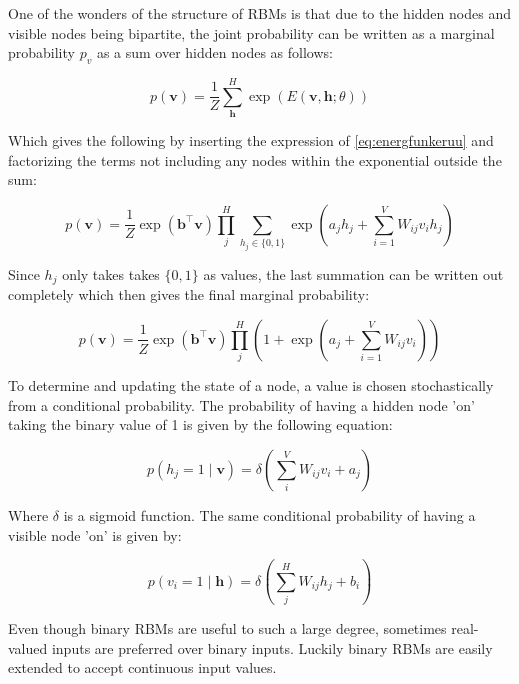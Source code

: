 \documentclass[../main.tex]{subfiles}
\begin{document}
One of the wonders of the structure of RBMs is that due to the hidden nodes and visible nodes being bipartite, the joint probability can be written as a marginal probability $p_{v}$ as a sum over hidden nodes as follows\cite{rbm_article}:

\begin{equation*}
    p(\mathbf{v}) =\frac{1}{Z} \sum_{\mathbf{h}}^H \exp ( E(\mathbf{v}, \mathbf{h}; \theta))
\end{equation*}

Which gives the following by inserting the expression of \autoref{eq:energfunkeruu} and factorizing the terms not including any nodes within the exponential outside the sum:

\begin{equation*}
    p(\mathbf{v})=\frac{1}{Z} \exp \left(\mathbf{b}^{\top} \mathbf{v}\right) \prod_{j}^{H} \sum_{h_{j} \in\{0,1\}} \exp \left(a_{j} h_{j}+\sum_{i=1}^{V} W_{i j} v_{i} h_{j}\right)
\end{equation*}

Since $h_j$ only takes takes $\{0,1\}$ as values, the last summation can be written out completely which then gives the final marginal probability:

\begin{equation}
     p(\mathbf{v})=\frac{1}{Z} \exp \left(\mathbf{b}^{\top} \mathbf{v}\right) \prod_{j}^{H}\left(1+\exp \left(a_{j}+\sum_{i=1}^{V} W_{i j} v_{i}\right)\right)
\label{eq:marg_prob}
\end{equation}

To determine and updating the state of a node, a value is chosen stochastically from a conditional probability. The probability of having a hidden node 'on' taking the binary value of 1 is given by the following equation:

\begin{equation}
p\left(h_{j}=1 \mid \mathbf{v}\right)=\delta\left(\sum_{i}^V W_{i j} v_{i}+a_{j}\right)
\label{eq:CP_BH}
\end{equation}

Where $\delta$ is a sigmoid function. The same conditional probability of having a visible node 'on' is given by:

\begin{equation}
p\left(v_{i}=1 \mid \mathbf{h}\right)=\delta\left(\sum_{j}^H W_{i j} h_{j}+b_{i}\right)
\label{eq:CP_BV}
\end{equation}

Even though binary RBMs are useful to such a large degree, sometimes real-valued inputs are preferred over binary inputs. Luckily binary RBMs are easily extended to accept continuous input values.
\end{document}
